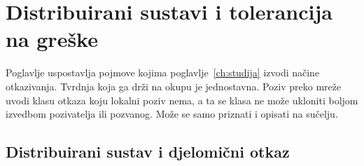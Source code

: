 %
%
\chapter{Distribuirani sustavi i tolerancija na greške}
\label{ch:distribuirani}

Poglavlje uspostavlja pojmove kojima poglavlje~\ref{ch:studija} izvodi
načine otkazivanja. Tvrdnja koja ga drži na okupu je jednostavna. Poziv
preko mreže uvodi klasu otkaza koju lokalni poziv nema, a ta se klasa ne
može ukloniti boljom izvedbom pozivatelja ili pozvanog. Može se samo
priznati i opisati na sučelju.

\section{Distribuirani sustav i djelomični otkaz}
\label{sec:djelomicni-otkaz}
%

